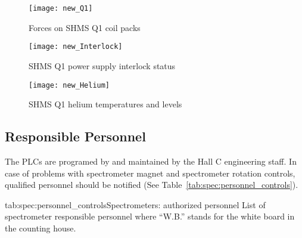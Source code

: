 {\begin{figure}
\begin{center}
\texttt{[image: new\_Q1]}
\caption{\label{fig:magc_q1}Forces on SHMS Q1 coil packs}
\end{center}
\end{figure}


\begin{figure}
\begin{center}
\texttt{[image: new\_Interlock]}
\caption{\label{fig:magc_Interlock}SHMS Q1 power supply interlock status}
\end{center}
\end{figure}


\begin{figure}
\begin{center}
\texttt{[image: new\_Helium]}
\caption{\label{fig:magc_Helium}SHMS Q1 helium temperatures and levels}
\end{center}
\end{figure}

\subsection{Responsible Personnel}
The PLCs are programed by and maintained by the Hall C engineering
staff.  In case of problems with spectrometer magnet and spectrometer
rotation controls, qualified personnel should be notified
(See Table~\ref{tab:spec:personnel_controls}).

\begin{namestab}{tab:spec:personnel_controls}{Spectrometers: authorized personnel}{%
      List of spectrometer responsible personnel where ``W.B.'' stands for the white board
      in the counting house.}
   \MikeFowler{}
   \PaulBrindza{}
   \SteveLassiter{}
   \EricSun{}
\end{namestab}

} %
